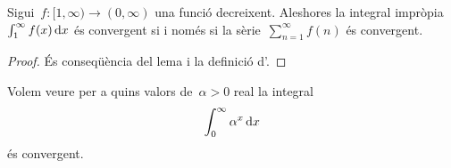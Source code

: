 \documentclass[../../main.tex]{subfiles}
\begin{document}
    \begin{solution}
    \end{solution}
    \begin{theorem}
        \label{thm:criteri-de-la-integral-per-integrals-impropies}
        Sigui~\(f\colon[1,\infty)\longrightarrow(0,\infty)\) una funció decreixent.
        Aleshores la integral impròpia~\(\int_{1}^{\infty}f(x)\mathop{}\!\mathrm{d} x\) és convergent si i només si la sèrie~\(\sum_{n=1}^{\infty}f(n)\) és convergent.
    \end{theorem}
    \begin{proof}
        És conseqüència del lema  i la definició d'.
    \end{proof}
    \begin{example}
        \label{ex:criteri-de-la-integral-per-integrals-impropies}
        Volem veure per a quins valors de~\(\alpha>0\) real la integral
        \begin{equation}
            \label{ex:criteri-de-la-integral-per-integrals-impropies:eq1}
            \int_{0}^{\infty}\alpha^{x}\mathop{}\!\mathrm{d} x
        \end{equation}
        és convergent.
    \end{example}
    \begin{solution}
    \end{solution}
\end{document}
